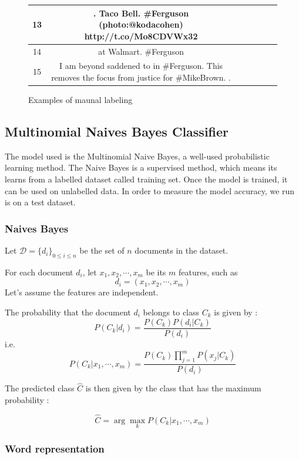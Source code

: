 \documentclass[a4paper,twoside,12pt,openright]{report}
\newcommand{\nl}{\tabularnewline\midrule}
\begin{document}
\begin{figure}[H]
\begin{tabular}{c|Cp{3cm}}
13 & . Taco Bell. \#Ferguson (photo:@kodacohen) http://t.co/Mo8CDVWx32 &  \newline {} \nl
14 &   at Walmart. \#Ferguson &  \newline {} \nl
15 & I am beyond saddened to  in \#Ferguson. This removes the focus from justice for \#MikeBrown. . &  \newline {} \nl
\end{tabular}
\caption{Examples of maunal labeling}
\label{tabtypes}
\end{figure}

\newpage

\subsection{Multinomial Naives Bayes Classifier}

The model used is the Multinomial Naive Bayes, a well-used probabilistic learning method.
The Naive Bayes is a supervised method, which means its learns from a labelled dataset called training set. Once the model is trained, it can be used on unlabelled data. In order to measure the model accuracy, we run is on a test dataset.

\subsubsection{Naives Bayes}
Let $ \mathcal{D} = \{ d_i \}_{0\leq i\leq n} $ be the set of $n$ documents in the dataset.

For each document $d_i$, let $x_{1},x_{2},\cdots,x_{m}$ be its $m$ features, such as $$d_i = (x_{1},x_{2},\cdots,x_{m})$$
Let's assume the features are independent.

The probability that the document $d_i$ belongs to class $C_k$ is given by :
$$ P(C_k|d_i) = \frac{P(C_k)P(d_i|C_k)}{P(d_i)} $$
i.e. $$ P(C_k|x_{1},\cdots,x_{m}) = \frac{P(C_k)\prod_{j=1}^mP(x_{j}|C_k)}{P(d_i)} $$

The predicted class $\hat{C}$ is then given by the class that has the maximum probability :

$$ \hat{C} = \arg \max_k P(C_k|x_{1},\cdots,x_{m}) $$

\subsubsection{Word representation}
\end{document}
